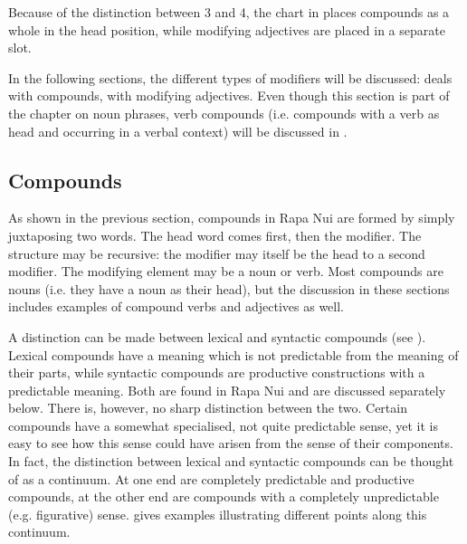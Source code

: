 Because of the distinction between 3 and 4, the  chart in  places compounds as a whole in the head position, while modifying adjectives are placed in a separate slot.

In the following sections, the different types of modifiers will be discussed:  deals with compounds,  with modifying adjectives. Even though this section is part of the chapter on noun phrases, verb compounds (i.e. compounds with a verb as head and occurring in a verbal context) will be discussed in .

\subsection{Compounds}\label{sec:5.7.2}
As shown in the previous section, compounds in Rapa Nui are formed by simply juxtaposing two words. The head word comes first, then the modifier. The structure may be recursive: the modifier may itself be the head to a second modifier. The modifying element may be a noun or verb. Most compounds are nouns (i.e. they have a noun as their head), but the discussion in these sections includes examples of compound verbs and adjectives as well.

A distinction can be made between lexical and syntactic compounds (see \citealt[175]{Dryer2007Noun}). Lexical compounds have a meaning which is not predictable from the meaning of their parts, while syntactic compounds are productive constructions with a predictable meaning. Both are found in Rapa Nui and are discussed separately below. There is, however, no sharp distinction between the two. Certain compounds have a somewhat specialised, not quite predictable sense, yet it is easy to see how this sense could have arisen from the sense of their components. In fact, the distinction between lexical and syntactic compounds can be thought of as a continuum. At one end are completely predictable and productive compounds, at the other end are compounds with a completely unpredictable (e.g. figurative) sense.  gives examples illustrating different points along this continuum.

